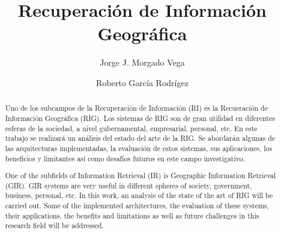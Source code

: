 \documentclass{llncs}
\begin{document}
\frontmatter
\pagestyle{headings}  %

\mainmatter              %
%
\title{Recuperación de Información Geográfica}
%
%
\author{Jorge J. Morgado Vega \and Roberto García Rodrígez}
%
%
%

\maketitle              %

\renewcommand\abstractname{Resúmen.}
\renewcommand\keywordname{{\bf Palabras Claves:}}
\begin{abstract}
	Uno de los subcampos de la Recuperación de Información (RI) es la
	Recueración de Información Geográfica (RIG). Los sistemas de RIG son de
	gran utilidad en diferentes esferas de la sociedad, a nivel gubernamental,
	empresarial, personal, etc. En este trabajo se realizará un análisis del
	estado del arte de la RIG. Se abordarán algunas de las arquitecturas
	implementadas, la evaluación de estos sistemas, sus aplicaciones, los
	beneficios y limitantes así como desafíos futuros en este campo
	investigativo.
\end{abstract}
\renewcommand\abstractname{Abstract.}
\renewcommand\keywordname{{\bf Keywords:}}
\begin{abstract}
	One of the subfields of Information Retrieval (IR) is Geographic Information
	Retrieval (GIR). GIR systems are very useful in different spheres of society,
	government, business, personal, etc. In this work, an analysis of the state of
	the art of RIG will be carried out. Some of the implemented architectures, the
	evaluation of these systems, their applications, the benefits and limitations
	as well as future challenges in this research field will be addressed.
\end{abstract}
%
\end{document}
